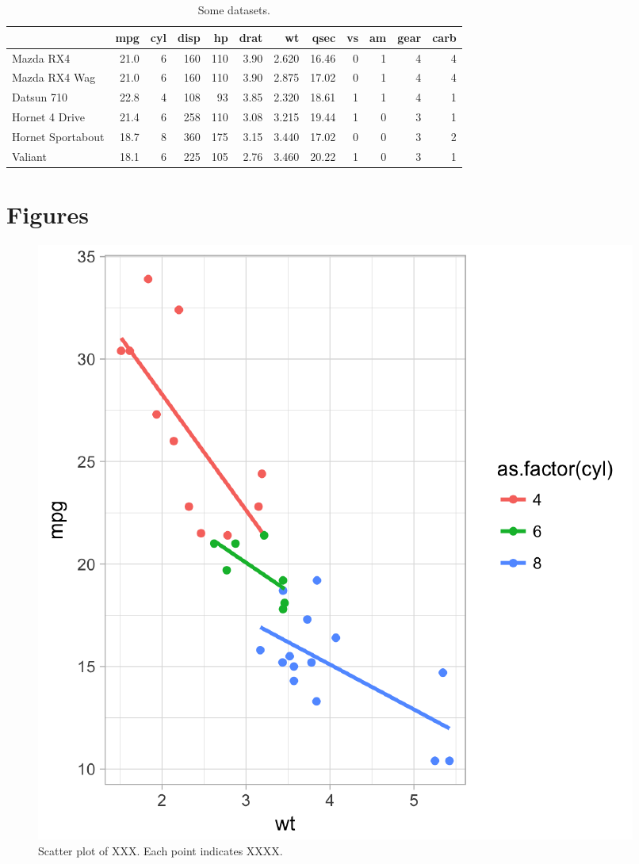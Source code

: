 \documentclass[12pt,]{article}
\begin{document}
\newpage

\hypertarget{section-1}{%
\section{}\label{section-1}}

\begin{table}

\caption{\label{tab:tblm2}Some datasets.}
\centering
\begin{tabular}[t]{l|r|r|r|r|r|r|r|r|r|r|r}
\hline
  & mpg & cyl & disp & hp & drat & wt & qsec & vs & am & gear & carb\\
\hline
Mazda RX4 & 21.0 & 6 & 160 & 110 & 3.90 & 2.620 & 16.46 & 0 & 1 & 4 & 4\\
\hline
Mazda RX4 Wag & 21.0 & 6 & 160 & 110 & 3.90 & 2.875 & 17.02 & 0 & 1 & 4 & 4\\
\hline
Datsun 710 & 22.8 & 4 & 108 & 93 & 3.85 & 2.320 & 18.61 & 1 & 1 & 4 & 1\\
\hline
Hornet 4 Drive & 21.4 & 6 & 258 & 110 & 3.08 & 3.215 & 19.44 & 1 & 0 & 3 & 1\\
\hline
Hornet Sportabout & 18.7 & 8 & 360 & 175 & 3.15 & 3.440 & 17.02 & 0 & 0 & 3 & 2\\
\hline
Valiant & 18.1 & 6 & 225 & 105 & 2.76 & 3.460 & 20.22 & 1 & 0 & 3 & 1\\
\hline
\end{tabular}
\end{table}

\newpage

\hypertarget{figures}{%
\section{Figures}\label{figures}}

\begin{figure}
\centering
\includegraphics{main_text_files/figure-latex/scatplt-1.pdf}
\caption{\label{fig:scatplt}Scatter plot of XXX. Each point indicates XXXX.}
\end{figure}
\end{document}
